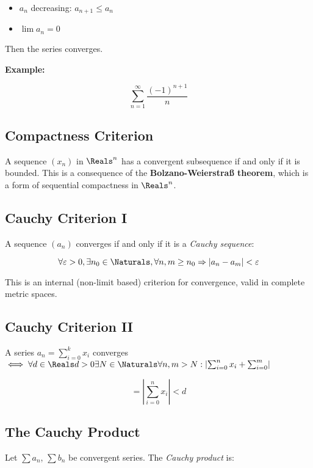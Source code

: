 \begin{itemize}

  \item \(a_n\) decreasing: \(a_{n+1} \le a_n\)

  \item \(\lim a_n = 0\)

\end{itemize}

Then the series converges.

\textbf{Example:}

\[
    \sum_{n=1}^\infty \frac{{(-1)}^{n+1}}{n}
\]

\subsection{Compactness Criterion}

A sequence \((x_n)\) in \(\Reals^n\) has a convergent subsequence if and only if it is bounded. 
This is a consequence of the \textbf{Bolzano-Weierstraß theorem}, which is a form of sequential 
compactness in \(\Reals^n\).

\subsection{Cauchy Criterion I}

A sequence \((a_n)\) converges if and only if it is a \emph{Cauchy sequence}:

\[
    \forall \varepsilon > 0, \exists n_0 \in \Naturals, \forall n, m \ge n_0 \Rightarrow |a_n - a_m| < \varepsilon
\]

This is an internal (non-limit based) criterion for convergence, valid in complete metric spaces.

\subsection{Cauchy Criterion II}

A series \(a_n = \sum_{i = 0}^{k}x_i\) converges \(\iff \forall d \in \Reals d > 0 
\exists N \in \Naturals \forall n,m > N: \left| \sum_{i = 0}^{n}x_i + \sum_{i=0}^{m}\right|\)

\[
    = \left|\sum_{i = 0}^{n}x_i\right| < d
\]

\subsection{The Cauchy Product}

Let \(\sum a_n\), \(\sum b_n\) be convergent series. The \emph{Cauchy product} is:

